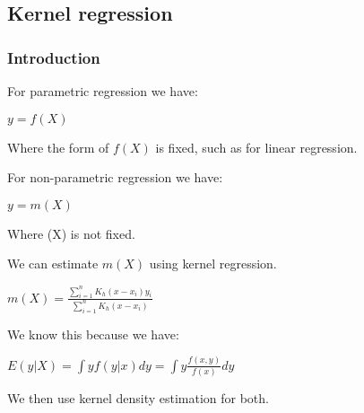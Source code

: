 
\subsection{Kernel regression}

\subsubsection{Introduction}

For parametric regression we have:

\(y=f(X)\)

Where the form of \(f(X)\) is fixed, such as for linear regression.

For non-parametric regression we have:

\(y=m(X)\)

Where \m(X)\) is not fixed.

We can estimate \(m(X)\) using kernel regression.

\(m(X)=\frac{\sum_{i=1}^nK_h(x-x_i)y_i}{\sum_{i=1}^nK_h(x-x_i)}\)

We know this because we have:

\(E(y|X)=\int yf(y|x)dy=\int y\frac{f(x,y)}{f(x)}dy\)

We then use kernel density estimation for both.

